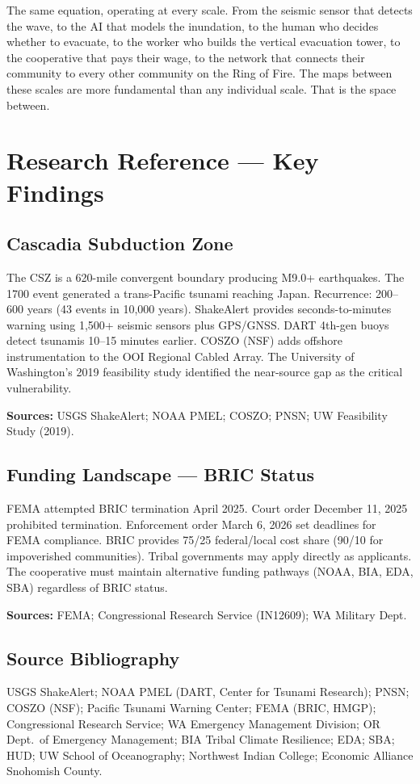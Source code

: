 \documentclass[11pt,letterpaper]{article}
\newcommand{\stageheader}[2]{%
  \noindent\colorbox{#2}{\makebox[\textwidth][l]{%
    \textcolor{white}{\bfseries\sffamily\hspace{6pt}#1\hspace{6pt}}}}%
  \vspace{0.5em}\par%
}
\begin{document}
The same equation, operating at every scale. From the seismic sensor that detects the wave, to the AI that models the inundation, to the human who decides whether to evacuate, to the worker who builds the vertical evacuation tower, to the cooperative that pays their wage, to the network that connects their community to every other community on the Ring of Fire. The maps between these scales are more fundamental than any individual scale. That is the space between.

\newpage
\stageheader{STAGE 2 --- RESEARCH REFERENCE}{secondary}

\section{Research Reference --- Key Findings}

\subsection{Cascadia Subduction Zone}
The CSZ is a 620-mile convergent boundary producing M9.0+ earthquakes. The 1700 event generated a trans-Pacific tsunami reaching Japan. Recurrence: 200--600 years (43 events in 10,000 years). ShakeAlert provides seconds-to-minutes warning using 1,500+ seismic sensors plus GPS/GNSS. DART 4th-gen buoys detect tsunamis 10--15 minutes earlier. COSZO (NSF) adds offshore instrumentation to the OOI Regional Cabled Array. The University of Washington's 2019 feasibility study identified the near-source gap as the critical vulnerability.

\textbf{Sources:} USGS ShakeAlert; NOAA PMEL; COSZO; PNSN; UW Feasibility Study (2019).

\subsection{Funding Landscape --- BRIC Status}
FEMA attempted BRIC termination April 2025. Court order December 11, 2025 prohibited termination. Enforcement order March 6, 2026 set deadlines for FEMA compliance. BRIC provides 75/25 federal/local cost share (90/10 for impoverished communities). Tribal governments may apply directly as applicants. The cooperative must maintain alternative funding pathways (NOAA, BIA, EDA, SBA) regardless of BRIC status.

\textbf{Sources:} FEMA; Congressional Research Service (IN12609); WA Military Dept.

\subsection{Source Bibliography}
USGS ShakeAlert; NOAA PMEL (DART, Center for Tsunami Research); PNSN; COSZO (NSF); Pacific Tsunami Warning Center; FEMA (BRIC, HMGP); Congressional Research Service; WA Emergency Management Division; OR Dept.\ of Emergency Management; BIA Tribal Climate Resilience; EDA; SBA; HUD; UW School of Oceanography; Northwest Indian College; Economic Alliance Snohomish County.
\end{document}
